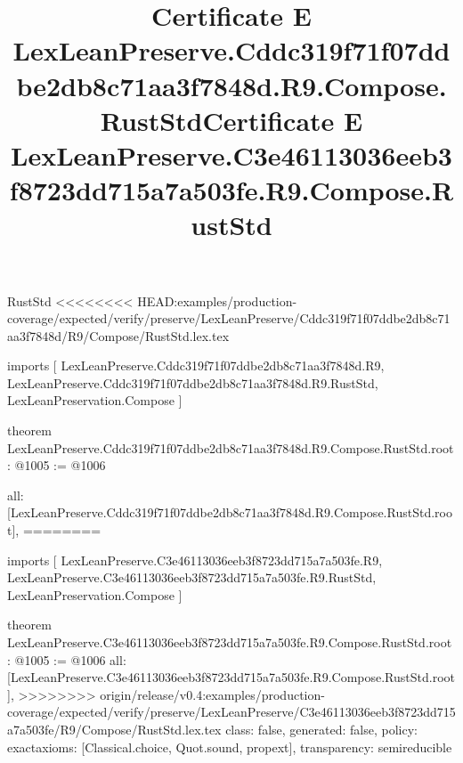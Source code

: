 \begin{lexlean}{RustStd}
<<<<<<<< HEAD:examples/production-coverage/expected/verify/preserve/LexLeanPreserve/Cddc319f71f07ddbe2db8c71aa3f7848d/R9/Compose/RustStd.lex.tex
\title{Certificate E LexLeanPreserve.Cddc319f71f07ddbe2db8c71aa3f7848d.R9.Compose.RustStd}
\begin{coremodule}
imports [
  LexLeanPreserve.Cddc319f71f07ddbe2db8c71aa3f7848d.R9,
  LexLeanPreserve.Cddc319f71f07ddbe2db8c71aa3f7848d.R9.RustStd,
  LexLeanPreservation.Compose
]

theorem LexLeanPreserve.Cddc319f71f07ddbe2db8c71aa3f7848d.R9.Compose.RustStd.root : @1005 := @1006 {
  all: [LexLeanPreserve.Cddc319f71f07ddbe2db8c71aa3f7848d.R9.Compose.RustStd.root],
========
\title{Certificate E LexLeanPreserve.C3e46113036eeb3f8723dd715a7a503fe.R9.Compose.RustStd}
\begin{coremodule}
imports [
  LexLeanPreserve.C3e46113036eeb3f8723dd715a7a503fe.R9,
  LexLeanPreserve.C3e46113036eeb3f8723dd715a7a503fe.R9.RustStd,
  LexLeanPreservation.Compose
]

theorem LexLeanPreserve.C3e46113036eeb3f8723dd715a7a503fe.R9.Compose.RustStd.root : @1005 := @1006 {
  all: [LexLeanPreserve.C3e46113036eeb3f8723dd715a7a503fe.R9.Compose.RustStd.root],
>>>>>>>> origin/release/v0.4:examples/production-coverage/expected/verify/preserve/LexLeanPreserve/C3e46113036eeb3f8723dd715a7a503fe/R9/Compose/RustStd.lex.tex
  class: false,
  generated: false,
  policy: exact{axioms: [Classical.choice, Quot.sound, propext]},
  transparency: semireducible
}


\end{coremodule}}
\end{coremodule}
\end{lexlean}
